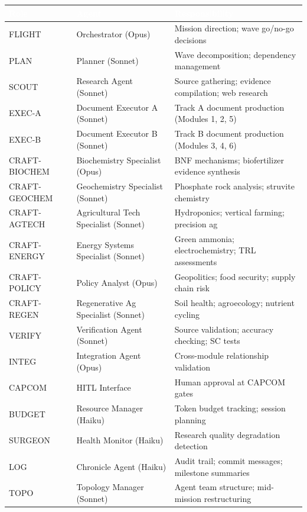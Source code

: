 \documentclass[11pt,letterpaper]{article}
\newcommand{\tableheader}[1]{\textbf{\sffamily\textcolor{white}{#1}}}
\begin{document}
\begin{center}
\begin{tabularx}{\textwidth}{L{2cm}L{3.5cm}X}
\toprule
{}
\tableheader{Role} & \tableheader{Agent} & \tableheader{Responsibility} \\
\midrule
FLIGHT & Orchestrator (Opus) & Mission direction; wave go/no-go decisions \\
PLAN & Planner (Sonnet) & Wave decomposition; dependency management \\
SCOUT & Research Agent (Sonnet) & Source gathering; evidence compilation; web research \\
EXEC-A & Document Executor A (Sonnet) & Track A document production (Modules 1, 2, 5) \\
EXEC-B & Document Executor B (Sonnet) & Track B document production (Modules 3, 4, 6) \\
CRAFT-BIOCHEM & Biochemistry Specialist (Opus) & BNF mechanisms; biofertilizer evidence synthesis \\
CRAFT-GEOCHEM & Geochemistry Specialist (Sonnet) & Phosphate rock analysis; struvite chemistry \\
CRAFT-AGTECH & Agricultural Tech Specialist (Sonnet) & Hydroponics; vertical farming; precision ag \\
CRAFT-ENERGY & Energy Systems Specialist (Sonnet) & Green ammonia; electrochemistry; TRL assessments \\
CRAFT-POLICY & Policy Analyst (Opus) & Geopolitics; food security; supply chain risk \\
CRAFT-REGEN & Regenerative Ag Specialist (Sonnet) & Soil health; agroecology; nutrient cycling \\
VERIFY & Verification Agent (Sonnet) & Source validation; accuracy checking; SC tests \\
INTEG & Integration Agent (Opus) & Cross-module relationship validation \\
CAPCOM & HITL Interface & Human approval at CAPCOM gates \\
BUDGET & Resource Manager (Haiku) & Token budget tracking; session planning \\
SURGEON & Health Monitor (Haiku) & Research quality degradation detection \\
LOG & Chronicle Agent (Haiku) & Audit trail; commit messages; milestone summaries \\
TOPO & Topology Manager (Sonnet) & Agent team structure; mid-mission restructuring \\
\bottomrule
\end{tabularx}
\end{center}
\end{document}
